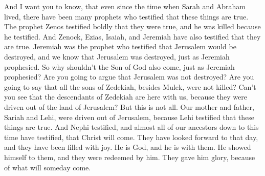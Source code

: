 \bverse \iffalse And now I would that ye should know, that even since the days of Abraham there have been many prophets that have testified these things; yea, behold, the prophet Zenos did testify boldly; for the which he was slain. \fi
And I want you to know, that even since the time when Sarah and Abraham lived, there have been many prophets who testified that these things are true. The prophet Zenos testified boldly that they were true, and he was killed because he testified.
\bverse \iffalse And behold, also Zenock, and also Ezias, and also Isaiah, and Jeremiah, (Jeremiah being that same prophet who testified of the destruction of Jerusalem) and now we know that Jerusalem was destroyed according to the words of Jeremiah. O then why not the Son of God come, according to his prophecy? \fi
And Zenock, Ezias, Isaiah, and Jeremiah have also testified that they are true. Jeremiah was the prophet who testified that Jerusalem would be destroyed, and we know that Jerusalem was destroyed, just as Jeremiah prophesied. So why shouldn't the Son of God also come, just as Jeremiah prophesied?
\bverse \iffalse And now will you dispute that Jerusalem was destroyed? Will ye say that the sons of Zedekiah were not slain, all except it were Mulek? Yea, and do ye not behold that the seed of Zedekiah are with us, and they were driven out of the land of Jerusalem?  But behold, this is not all-- \fi
Are you going to argue that Jerusalem was not destroyed? Are you going to say that all the sons of Zedekiah, besides Mulek, were not killed? Can't you see that the descendants of Zedekiah are here with us, because they were driven out of the land of Jerusalem? But this is not all.
\bverse \iffalse Our father Lehi was driven out of Jerusalem because he testified of these things. Nephi also testified of these things, and also almost all of our fathers, even down to this time; yea, they have testified of the coming of Christ, and have looked forward, and have rejoiced in his day which is to come. \fi
Our mother and father, Sariah and Lehi, were driven out of Jerusalem, because Lehi testified that these things are true. And Nephi testified, and almost all of our ancestors down to this time have testified, that Christ will come. They have looked forward to that day, and they have been filled with joy.
\bverse \iffalse And behold, he is God, and he is with them, and he did manifest himself unto them, that they were redeemed by him; and they gave unto him glory, because of that which is to come. \fi
He is God, and he is with them. He showed himself to them, and they were redeemed by him. They gave him glory, because of what will someday come.
